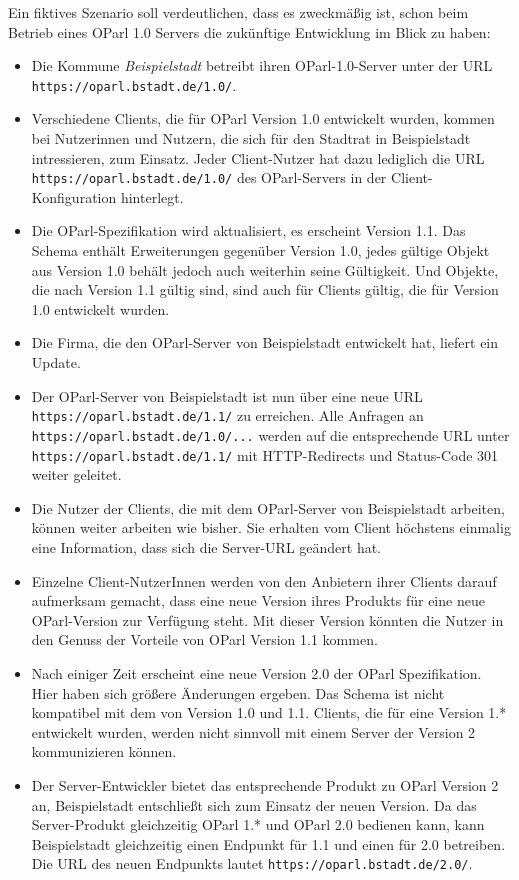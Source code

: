 \documentclass[,a4paper]{article}
\begin{document}
Ein fiktives Szenario soll verdeutlichen, dass es zweckmäßig ist, schon
beim Betrieb eines OParl 1.0 Servers die zukünftige Entwicklung im Blick
zu haben:

\begin{itemize}
\item
  Die Kommune \emph{Beispielstadt} betreibt ihren OParl-1.0-Server unter
  der URL \texttt{https://oparl.bstadt.de/1.0/}.
\item
  Verschiedene Clients, die für OParl Version 1.0 entwickelt wurden,
  kommen bei Nutzerinnen und Nutzern, die sich für den Stadtrat in
  Beispielstadt intressieren, zum Einsatz. Jeder Client-Nutzer hat dazu
  lediglich die URL \texttt{https://oparl.bstadt.de/1.0/} des
  OParl-Servers in der Client-Konfiguration hinterlegt.
\item
  Die OParl-Spezifikation wird aktualisiert, es erscheint Version 1.1.
  Das Schema enthält Erweiterungen gegenüber Version 1.0, jedes gültige
  Objekt aus Version 1.0 behält jedoch auch weiterhin seine Gültigkeit.
  Und Objekte, die nach Version 1.1 gültig sind, sind auch für Clients
  gültig, die für Version 1.0 entwickelt wurden.
\item
  Die Firma, die den OParl-Server von Beispielstadt entwickelt hat,
  liefert ein Update.
\item
  Der OParl-Server von Beispielstadt ist nun über eine neue URL
  \texttt{https://oparl.bstadt.de/1.1/} zu erreichen. Alle Anfragen an
  \texttt{https://oparl.bstadt.de/1.0/...} werden auf die entsprechende
  URL unter \texttt{https://oparl.bstadt.de/1.1/} mit HTTP-Redirects und
  Status-Code 301 weiter geleitet.
\item
  Die Nutzer der Clients, die mit dem OParl-Server von Beispielstadt
  arbeiten, können weiter arbeiten wie bisher. Sie erhalten vom Client
  höchstens einmalig eine Information, dass sich die Server-URL geändert
  hat.
\item
  Einzelne Client-NutzerInnen werden von den Anbietern ihrer Clients
  darauf aufmerksam gemacht, dass eine neue Version ihres Produkts für
  eine neue OParl-Version zur Verfügung steht. Mit dieser Version
  könnten die Nutzer in den Genuss der Vorteile von OParl Version 1.1
  kommen.
\item
  Nach einiger Zeit erscheint eine neue Version 2.0 der OParl
  Spezifikation. Hier haben sich größere Änderungen ergeben. Das Schema
  ist nicht kompatibel mit dem von Version 1.0 und 1.1. Clients, die für
  eine Version 1.* entwickelt wurden, werden nicht sinnvoll mit einem
  Server der Version 2 kommunizieren können.
\item
  Der Server-Entwickler bietet das entsprechende Produkt zu OParl
  Version 2 an, Beispielstadt entschließt sich zum Einsatz der neuen
  Version. Da das Server-Produkt gleichzeitig OParl 1.* und OParl 2.0
  bedienen kann, kann Beispielstadt gleichzeitig einen Endpunkt für 1.1
  und einen für 2.0 betreiben. Die URL des neuen Endpunkts lautet
  \texttt{https://oparl.bstadt.de/2.0/}.
\end{itemize}
\end{document}
